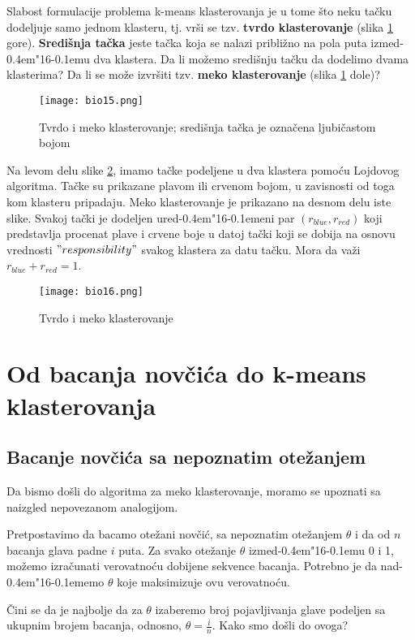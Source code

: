 \documentclass[a4paper]{book}
\def \dj {d\kern-0.4em\char"16\kern-0.1em}
\begin{document}
Slabost formulacije problema k-means klasterovanja je u tome što neku tačku dodeljuje samo jednom klasteru, tj. vrši se tzv. \textbf{tvrdo klasterovanje} (slika \ref{slika 15} gore).  \textbf{Središnja tačka} jeste tačka koja se nalazi približno na pola puta izme\dj u dva klastera. Da li možemo središnju tačku da dodelimo dvama klasterima? Da li se može izvršiti tzv. \textbf{meko klasterovanje} (slika \ref{slika 15} dole)? 
\begin{figure}[h!]
    \centering
    \texttt{[image: bio15.png]}
    \caption{Tvrdo i meko klasterovanje; središnja tačka je označena ljubičastom bojom}
    \label{slika 15}
\end{figure}

Na levom delu slike \ref{slika 16}, imamo tačke podeljene u dva klastera pomoću Lojdovog algoritma. Tačke su prikazane plavom ili crvenom bojom, u zavisnosti od toga kom klasteru pripadaju. Meko klasterovanje je prikazano na desnom delu iste slike. Svakoj tački je dodeljen ure\dj eni par $(r_{blue}, r_{red})$ koji predstavlja procenat plave i crvene boje u datoj tački koji se dobija na osnovu vrednosti $"responsibility"$ svakog klastera za datu tačku. Mora da važi $r_{blue} + r_{red} = 1$.
\begin{figure}[h!]
    \centering
    \texttt{[image: bio16.png]}
    \caption{Tvrdo i meko klasterovanje}
    \label{slika 16}
\end{figure}

\section{Od bacanja novčića do k-means klasterovanja}
\subsection{Bacanje novčića sa nepoznatim otežanjem}
Da bismo došli do algoritma za meko klasterovanje, moramo se upoznati sa naizgled nepovezanom analogijom.

Pretpostavimo da bacamo otežani novčić, sa nepoznatim otežanjem $\theta$ i da od $n$ bacanja glava padne $i$ puta. Za svako otežanje $\theta$ izme\dj u 0 i 1, možemo izračunati verovatnoću dobijene sekvence bacanja. Potrebno je da na\dj emo $\theta$ koje maksimizuje ovu verovatnoću.

Čini se da je najbolje da za $\theta$ izaberemo broj pojavljivanja glave podeljen sa ukupnim brojem bacanja, odnosno, $\theta = \frac{i}{n}$. Kako smo došli do ovoga?
\end{document}
